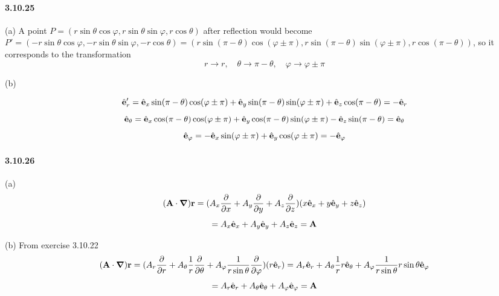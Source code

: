 \documentclass[a4paper]{article}
\begin{document}
\paragraph{3.10.25}
(a) A point $P=(r\sin\theta\cos\varphi,r\sin\theta\sin\varphi,r\cos\theta)$ after reflection would become\\ $P'=(-r\sin\theta\cos\varphi,-r\sin\theta\sin\varphi,-r\cos\theta)=(r\sin(\pi-\theta)\cos(\varphi\pm\pi),r\sin(\pi-\theta)\sin(\varphi\pm\pi),r\cos(\pi-\theta))$, so it corresponds to the transformation 
\[
r\rightarrow r,\quad\theta\rightarrow\pi-\theta,\quad \varphi\rightarrow\varphi\pm\pi
\]

(b) 

\[\hat{\mathbf{e}}_r'=\hat{\mathbf{e}}_x\sin(\pi-\theta)\cos(\varphi\pm\pi)+\hat{\mathbf{e}}_y\sin(\pi-\theta)\sin(\varphi\pm\pi)+\hat{\mathbf{e}}_z\cos(\pi-\theta)=-\hat{\mathbf{e}}_r
\]
\[ \hat{\mathbf{e}}_\theta=\hat{\mathbf{e}}_x\cos(\pi-\theta)\cos(\varphi\pm\pi)+\hat{\mathbf{e}}_y\cos(\pi-\theta)\sin(\varphi\pm\pi)-\hat{\mathbf{e}}_z\sin(\pi-\theta)=\hat{\mathbf{e}}_\theta
\]
\[
\hat{\mathbf{e}}_\varphi=-\hat{\mathbf{e}}_x\sin(\varphi\pm\pi)+\hat{\mathbf{e}}_y\cos(\varphi\pm\pi)=-\hat{\mathbf{e}}_\varphi
\]

\paragraph{3.10.26}
(a)
\[
(\mathbf{A}\cdot\boldsymbol{\nabla})\mathbf{r}=(A_x\frac{\partial}{\partial x}+A_y\frac{\partial}{\partial y}+A_z\frac{\partial}{\partial z})(x\hat{\mathbf{e}}_x+y\hat{\mathbf{e}}_y+z\hat{\mathbf{e}}_z)\]
\[=A_x\hat{\mathbf{e}}_x+A_y\hat{\mathbf{e}}_y+A_z\hat{\mathbf{e}}_z=\mathbf{A}
\]

(b) 
From exercise 3.10.22
\[
(\mathbf{A}\cdot\boldsymbol{\nabla})\mathbf{r}=(A_r\frac{\partial}{\partial r}+A_\theta\frac{1}{r}\frac{\partial}{\partial\theta}+A_\varphi\frac{1}{r\sin\theta}\frac{\partial}{\partial\varphi})(r\hat{\mathbf{e}}_r)=A_r\hat{\mathbf{e}}_r+A_\theta\frac{1}{r}r\hat{\mathbf{e}}_\theta+A_\varphi\frac{1}{r\sin\theta}r\sin\theta\hat{\mathbf{e}}_\varphi\]
\[=A_r\hat{\mathbf{e}}_r+A_\theta\hat{\mathbf{e}}_\theta+A_\varphi\hat{\mathbf{e}}_\varphi=\mathbf{A}
\]
\end{document}
